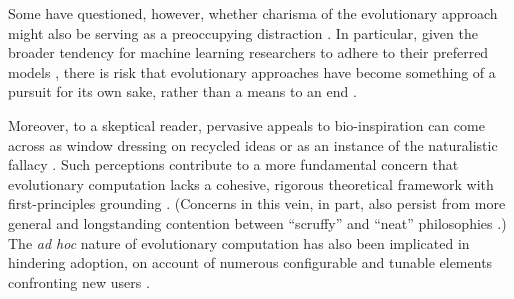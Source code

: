 Some have questioned, however, whether charisma of the evolutionary approach might also be serving as a preoccupying distraction \citep{moore2023evolution,sorensen2015metaheuristics}.
In particular, given the broader tendency for machine learning researchers to adhere to their preferred models \citep{domingos2012few}, there is risk that evolutionary approaches have become something of a pursuit for its own sake, rather than a means to an end \citep{woodward2016gp,yampolskiy2018we}.



Moreover, to a skeptical reader, pervasive appeals to bio-inspiration can come across as window dressing on recycled ideas or as an instance of the naturalistic fallacy \citep{wortmann2020does,sorensen2015metaheuristics}.
Such perceptions contribute to a more fundamental concern that evolutionary computation lacks a cohesive, rigorous theoretical framework with first-principles grounding \citep{worzel2003genetic}.
(Concerns in this vein, in part, also persist from more general and longstanding contention between ``scruffy'' and ``neat'' philosophies \citep[p.~16]{jones2008artificial, minsky1991logical}.)
The \textit{ad hoc} nature of evolutionary computation has also been implicated in hindering adoption, on account of numerous configurable and tunable elements confronting new users \citep{oneil2010open}.

